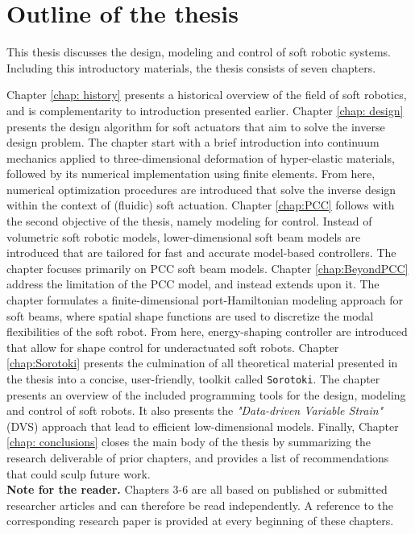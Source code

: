 \section{Outline of the thesis}
\label{sec:intro:outline}
This thesis discusses the design, modeling and control of soft robotic systems. Including this introductory materials, the thesis consists of seven chapters. 

Chapter \ref{chap: history} presents a historical overview of the field of soft robotics, and is complementarity to introduction presented earlier. Chapter \ref{chap: design} presents the design algorithm for soft actuators that aim to solve the inverse design problem. The chapter start with a brief introduction into continuum mechanics applied to three-dimensional deformation of hyper-elastic materials, followed by its numerical implementation using finite elements. From here, numerical optimization procedures are introduced that solve the inverse design within the context of (fluidic) soft actuation. Chapter \ref{chap:PCC} follows with the second objective of the thesis, namely modeling for control. Instead of volumetric soft robotic models, lower-dimensional soft beam models are introduced that are tailored for fast and accurate model-based controllers. The chapter focuses primarily on PCC soft beam models. Chapter \ref{chap:BeyondPCC} address the limitation of the PCC model, and instead extends upon it. The chapter formulates a finite-dimensional port-Hamiltonian modeling approach for soft beams, where spatial shape functions are used to discretize the modal flexibilities of the soft robot. From here, energy-shaping controller are introduced that allow for shape control for underactuated soft robots. Chapter \ref{chap:Sorotoki} presents the culmination of all theoretical material presented in the thesis into a concise, user-friendly, toolkit called \texttt{Sorotoki}. The chapter presents an overview of the included programming tools for the design, modeling and control of soft robots. It also presents the \textit{"Data-driven Variable Strain"} (DVS) approach that lead to efficient low-dimensional models. Finally, Chapter \ref{chap: conclusions} closes the main body of the thesis by summarizing the research deliverable of prior chapters, and provides a list of recommendations that could sculp future work.
\\

\textbf{Note for the reader.} Chapters 3-6 are all based on published or submitted researcher articles and can therefore be read independently. A reference to the corresponding research paper is provided at every beginning of these chapters. 

